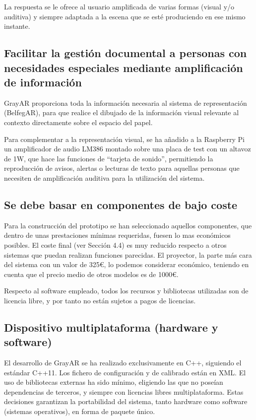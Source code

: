 La respuesta se le ofrece al usuario amplificada de varias formas (visual y/o auditiva) y siempre adaptada a la escena que se esté produciendo en ese mismo instante.

\subsection{Facilitar la gestión documental a personas con necesidades especiales mediante amplificación de información} 
GrayAR proporciona toda la información necesaria al sistema de representación (BelfegAR), para que realice el dibujado de la información visual relevante al contexto directamente sobre el espacio del papel.

Para complementar a la representación visual, se ha añadido a la Raspberry Pi un amplificador de audio LM386 montado sobre una placa de test con un altavoz de 1W, que hace las funciones de ``tarjeta de sonido'', permitiendo la reproducción de avisos, alertas o lecturas de texto para aquellas personas que necesiten de amplificación auditiva para la utilización del sistema.
  
\subsection{Se debe basar en componentes de bajo coste}
Para la construcción del prototipo se han seleccionado aquellos componentes, que dentro de unas prestaciones mínimas requeridas, fuesen lo mas económicos posibles. El coste final (ver Sección 4.4) es muy reducido respecto a otros sistemas que puedan realizan funciones parecidas. El proyector, la parte más cara del sistema con un valor de 325\euro, lo podemos considerar económico, teniendo en cuenta que el precio medio de otros modelos es de 1000\euro.

Respecto al software empleado, todos los recursos y bibliotecas utilizadas son de licencia libre, y por tanto no están sujetos a pagos de licencias. 

\subsection{Dispositivo multiplataforma (hardware y software)}
El desarrollo de GrayAR se ha realizado exclusivamente en C++, siguiendo el estándar C++11. Los fichero de configuración y de calibrado están en XML. El uso de bibliotecas externas ha sido mínimo, eligiendo las que no poseían dependencias de terceros, y siempre con licencias libres multiplataforma. Estas decisiones garantizan la portabilidad del sistema, tanto hardware como software (sistemas operativos), en forma de paquete único.



